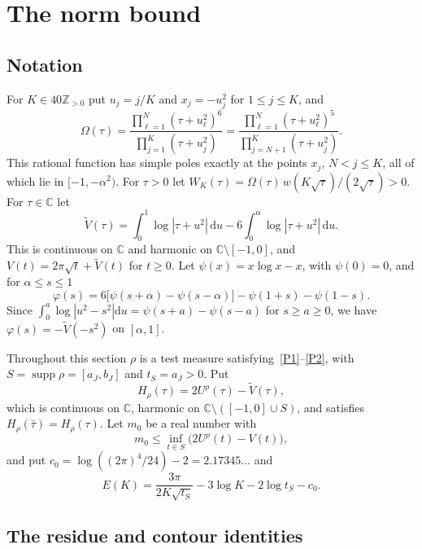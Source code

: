 \documentclass[11pt]{article}
\theoremstyle{remark}
\newcommand{\Z}{\mathbb{Z}}
\newcommand{\C}{\mathbb{C}}
\newcommand{\Vt}{\widetilde{V}}
\newcommand{\dd}{\mathrm{d}}
\DeclareMathOperator{\supp}{supp}
\begin{document}
\section{The norm bound}\label{sec:norm}

\subsection{Notation}

For $K\in40\Z_{>0}$ put $u_j=j/K$ and $x_j=-u_j^2$ for $1\le j\le K$, and
\[
\Omega(\tau)=\frac{\prod_{\ell=1}^N(\tau+u_\ell^2)^6}{\prod_{j=1}^K(\tau+u_j^2)}=\frac{\prod_{\ell=1}^N(\tau+u_\ell^2)^5}{\prod_{j=N+1}^K(\tau+u_j^2)} .
\]
This rational function has simple poles exactly at the points $x_j$, $N<j\le K$, all of which lie in $[-1,-\alpha^2)$. For $\tau>0$ let $W_K(\tau)=\Omega(\tau)\,w(K\sqrt\tau)/(2\sqrt\tau)>0$. For $\tau\in\C$ let
\[
\Vt(\tau)=\int_0^1\log|\tau+u^2|\,\dd u-6\int_0^\alpha\log|\tau+u^2|\,\dd u .
\]
This is continuous on $\C$ and harmonic on $\C\setminus[-1,0]$, and $V(t)=2\pi\sqrt t+\Vt(t)$ for $t\ge0$. Let $\psi(x)=x\log x-x$, with $\psi(0)=0$, and for $\alpha\le s\le1$
\[
\varphi(s)=6\bigl[\psi(s+\alpha)-\psi(s-\alpha)\bigr]-\psi(1+s)-\psi(1-s).
\]
Since $\int_0^a\log|u^2-s^2|\dd u=\psi(s+a)-\psi(s-a)$ for $s\ge a\ge0$, we have $\varphi(s)=-\Vt(-s^2)$ on $[\alpha,1]$.

Throughout this section $\rho$ is a test measure satisfying~\ref{P1}--\ref{P2}, with $S=\supp\rho=[a_J,b_J]$ and $t_S=a_J>0$. Put
\[
H_\rho(\tau)=2U^\rho(\tau)-\Vt(\tau),
\]
which is continuous on $\C$, harmonic on $\C\setminus([-1,0]\cup S)$, and satisfies $H_\rho(\bar\tau)=H_\rho(\tau)$. Let $m_0$ be a real number with
\begin{equation}\label{eq:m0}
m_0\le\inf_{t\in S}\bigl(2U^\rho(t)-V(t)\bigr),
\end{equation}
and put $c_0=\log((2\pi)^4/24)-2=2.17345\ldots$ and
\[
E(K)=\frac{3\pi}{2K\sqrt{t_S}}-3\log K-2\log t_S-c_0 .
\]

\subsection{The residue and contour identities}
\end{document}
